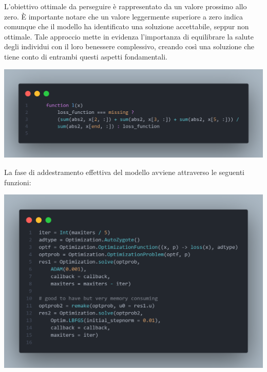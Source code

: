 L'obiettivo ottimale da perseguire è rappresentato da un valore prossimo 
allo zero. È importante notare che un valore leggermente superiore a zero 
indica comunque che il modello ha identificato una soluzione accettabile, 
seppur non ottimale. Tale approccio mette in evidenza l'importanza di 
equilibrare la salute degli individui con il loro benessere complessivo, 
creando così una soluzione che tiene conto di entrambi questi aspetti 
fondamentali.

\begin{minipage}{\linewidth}
	\centering
	\includegraphics[width=\textwidth]{img/lossFunction.png}
	\label{fig:lossFunction}
\end{minipage}


La fase di addestramento effettiva del modello avviene attraverso le 
seguenti funzioni:

\begin{minipage}{\linewidth}
	\centering
	\includegraphics[width=\textwidth]{img/controller3.png}
	\label{fig:controller3}
\end{minipage}

